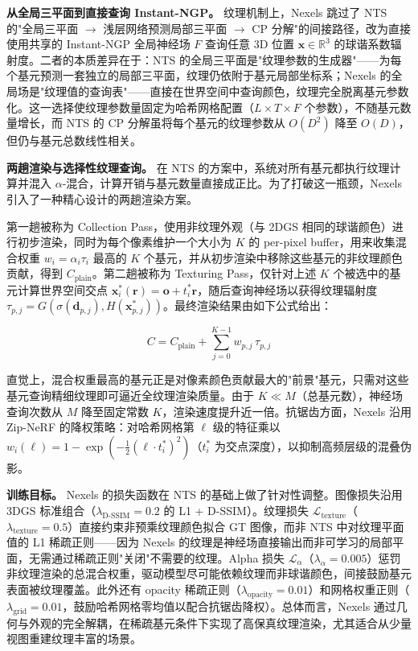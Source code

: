 \smallskip
\noindent\textbf{从全局三平面到直接查询 Instant-NGP。}
纹理机制上，Nexels 跳过了 NTS 的"全局三平面 $\to$ 浅层网络预测局部三平面 $\to$ CP 分解"的间接路径，改为直接使用共享的 Instant-NGP 全局神经场 $F$ 查询任意 3D 位置 $\mathbf{x} \in \mathbb{R}^3$ 的球谐系数辐射度。二者的本质差异在于：NTS 的全局三平面是"纹理参数的生成器"——为每个基元预测一套独立的局部三平面，纹理仍依附于基元局部坐标系；Nexels 的全局场是"纹理值的查询表"——直接在世界空间中查询颜色，纹理完全脱离基元参数化。这一选择使纹理参数量固定为哈希网格配置（$L \times T \times F$ 个参数），不随基元数量增长，而 NTS 的 CP 分解虽将每个基元的纹理参数从 $O(D^2)$ 降至 $O(D)$，但仍与基元总数线性相关。

\smallskip
\noindent\textbf{两趟渲染与选择性纹理查询。}
在 NTS 的方案中，系统对所有基元都执行纹理计算并混入 $\alpha$-混合，计算开销与基元数量直接成正比。为了打破这一瓶颈，Nexels 引入了一种精心设计的两趟渲染方案。

第一趟被称为 Collection Pass，使用非纹理外观（与 2DGS 相同的球谐颜色）进行初步渲染，同时为每个像素维护一个大小为 $K$ 的 per-pixel buffer，用来收集混合权重 $w_i = \alpha_i \tau_i$ 最高的 $K$ 个基元，并从初步渲染中移除这些基元的非纹理颜色贡献，得到 $C_{\text{plain}}$。第二趟被称为 Texturing Pass，仅针对上述 $K$ 个被选中的基元计算世界空间交点 $\mathbf{x}_i^*(\mathbf{r}) = \mathbf{o} + t_i^* \mathbf{r}$，随后查询神经场以获得纹理辐射度 $\tau_{p,j} = G(\sigma(\mathbf{d}_{p,j}), H(\mathbf{x}_{p,j}^*))$。最终渲染结果由如下公式给出：

\begin{equation}
C = C_{\text{plain}} + \sum_{j=0}^{K-1} w_{p,j}\, \tau_{p,j}
\end{equation}

直觉上，混合权重最高的基元正是对像素颜色贡献最大的"前景"基元，只需对这些基元查询精细纹理即可逼近全纹理渲染质量。由于 $K \ll M$（总基元数），神经场查询次数从 $M$ 降至固定常数 $K$，渲染速度提升近一倍。抗锯齿方面，Nexels 沿用 Zip-NeRF 的降权策略：对哈希网格第 $\ell$ 级的特征乘以 $w_i(\ell) = 1 - \exp(-\frac{1}{2}(\ell \cdot t_i^*)^2)$（$t_i^*$ 为交点深度），以抑制高频层级的混叠伪影。

\smallskip
\noindent\textbf{训练目标。}
Nexels 的损失函数在 NTS 的基础上做了针对性调整。图像损失沿用 3DGS 标准组合（$\lambda_{\text{D-SSIM}}=0.2$ 的 L1 + D-SSIM）。纹理损失 $\mathcal{L}_{\text{texture}}$（$\lambda_{\text{texture}}=0.5$）直接约束非预乘纹理颜色拟合 GT 图像，而非 NTS 中对纹理平面值的 L1 稀疏正则——因为 Nexels 的纹理是神经场直接输出而非可学习的局部平面，无需通过稀疏正则"关闭"不需要的纹理。Alpha 损失 $\mathcal{L}_\alpha$（$\lambda_\alpha=0.005$）惩罚非纹理渲染的总混合权重，驱动模型尽可能依赖纹理而非球谐颜色，间接鼓励基元表面被纹理覆盖。此外还有 opacity 稀疏正则（$\lambda_{\text{opacity}}=0.01$）和网格权重正则（$\lambda_{\text{grid}}=0.01$，鼓励哈希网格零均值以配合抗锯齿降权）。总体而言，Nexels 通过几何与外观的完全解耦，在稀疏基元条件下实现了高保真纹理渲染，尤其适合从少量视图重建纹理丰富的场景。

